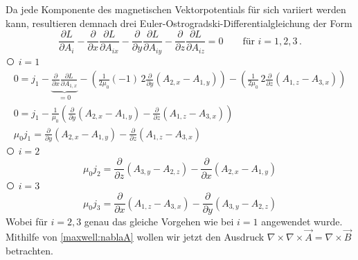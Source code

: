 Da jede Komponente des magnetischen Vektorpotentials für sich variiert werden kann, resultieren demnach drei Euler-Ostrogradski-Differentialgleichung der Form
\[ 
\frac{\partial L}{\partial A_i} 
- \frac{\partial}{\partial x}\frac{\partial L}{\partial A_{ix}}
- \frac{\partial}{\partial y}\frac{\partial L}{\partial A_{iy}}
- \frac{\partial}{\partial z}\frac{\partial L}{\partial A_{iz}}
= 0 \qquad \text{für } i=1,2,3
\, . \]
{\larger\textcircled{}} $i = 1$
\begin{subequations}
	\label{maxwell:magnetoL1}
\begin{gather}
	0
	=
	j_1 - \underbrace{\frac{\partial}{\partial x}\frac{\partial L}{\partial A_{1,x}}}_{=0}
	 - \left( \frac{1}{2\mu_0}(-1)\,2 \frac{\partial}{\partial y}(A_{2,x}-A_{1,y})\right) 
	 - \left( \frac{1}{2\mu_0}\,2\frac{\partial}{\partial z}(A_{1,z}-A_{3,x})\right)
	 \\
	 0
	 =
	 j_1 - \frac{1}{\mu_0}\left( \frac{\partial}{\partial y}(A_{2,x}-A_{1,y})
	 - \frac{\partial}{\partial z}(A_{1,z}-A_{3,x})
	 \right)  
	 \\	 
	 \mu_0j_1
	 =
	 \frac{\partial}{\partial y}(A_{2,x}-A_{1,y})
	 - \frac{\partial}{\partial z}(A_{1,z}-A_{3,x})	 	 	 
\end{gather}
\end{subequations}
{\larger\textcircled{}} $i = 2$
\begin{equation}
	\label{maxwell:magnetoL2}
	\mu_0j_2
	=
	\frac{\partial}{\partial z}(A_{3,y}-A_{2,z})
	- \frac{\partial}{\partial x}(A_{2,x}-A_{1,y})
\end{equation}
{\larger\textcircled{}} $i = 3$
\begin{equation}
	\label{maxwell:magnetoL3}
	\mu_0j_3
	=
	\frac{\partial}{\partial x}(A_{1,z}-A_{3,x})
	- \frac{\partial}{\partial y}(A_{3,y}-A_{2,z})
\end{equation}
Wobei für $i=2,3$ genau das gleiche Vorgehen wie bei $i=1$ angewendet wurde.
Mithilfe von \ref{maxwell:nablaA} wollen wir jetzt den Ausdruck $\nabla\times\nabla\times\vec{A} = \nabla\times\vec{B}$ betrachten.

